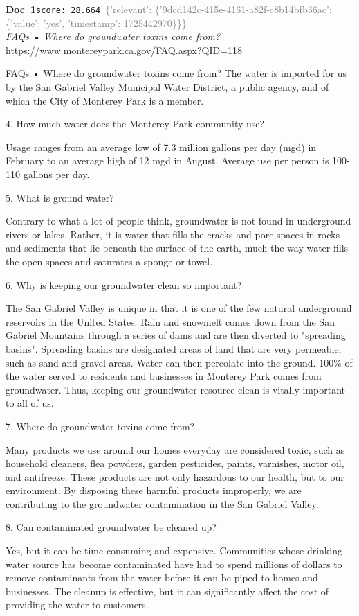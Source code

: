 \documentclass[a4paper,11pt]{article}
\begin{document}
\begin{docenv}
{\footnotesize\textcolor{doccolor}{\textbf{Doc~1}}}\hfill{\tiny\texttt{score:~28.664}}\ {\tiny\textcolor{gray}{\{'relevant': \{'9dcd142c-415e-4161-a82f-c8b14bfb36ac': \{'value': 'yes', 'timestamp': 1725442970\}\}\}}}\\[3pt]
{\small\textit{FAQs • Where do groundwater toxins come from?}}\\[2pt]
{\tiny\url{https://www.montereypark.ca.gov/FAQ.aspx?QID=118}}\\[4pt]
{\footnotesize FAQs • Where do groundwater toxins come from?
The water is imported for us by the San Gabriel Valley Municipal Water District, a public agency, and of which the City of Monterey Park is a member.	

4.
How much water does the Monterey Park community use?

Usage ranges from an average low of 7.3 million gallons per day (mgd) in February to an average high of 12 mgd in August. Average use per person is 100-110 gallons per day.	

5.
What is ground water?

Contrary to what a lot of people think, groundwater is not found in underground rivers or lakes. Rather, it is water that fills the cracks and pore spaces in rocks and sediments that lie beneath the surface of the earth, much the way water fills the open spaces and saturates a sponge or towel. 	

6.
Why is keeping our groundwater clean so important?

The San Gabriel Valley is unique in that it is one of the few natural underground reservoirs in the United States. Rain and snowmelt comes down from the San Gabriel Mountains through a series of dams and are then diverted to "spreading basins". Spreading basins are designated areas of land that are very permeable, such as sand and gravel areas. Water can then percolate into the ground. 100\% of the water served to residents and businesses in Monterey Park comes from groundwater. Thus, keeping our groundwater resource clean is vitally important to all of us. 	

7.
Where do groundwater toxins come from?

Many products we use around our homes everyday are considered toxic, such as household cleaners, flea powders, garden pesticides, paints, varnishes, motor oil, and antifreeze. These products are not only hazardous to our health, but to our environment. By disposing these harmful products improperly, we are contributing to the groundwater contamination in the San Gabriel Valley.	

8.
Can contaminated groundwater be cleaned up?

Yes, but it can be time-consuming and expensive. Communities whose drinking water source has become contaminated have had to spend millions of dollars to remove contaminants from the water before it can be piped to homes and businesses. The cleanup is effective, but it can significantly affect the cost of providing the water to customers.}
\end{docenv}
\end{document}
